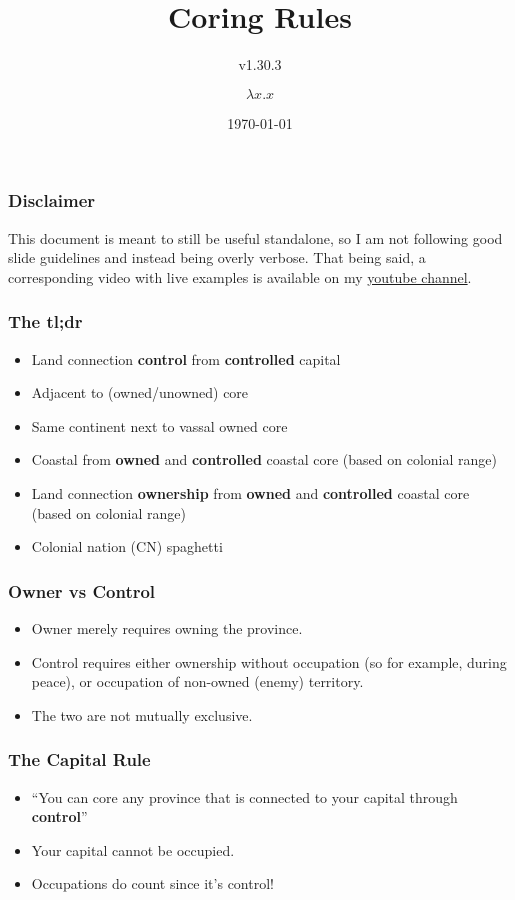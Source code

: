 \documentclass{beamer}
\title{Coring Rules}
\subtitle{v1.30.3}
\author{$\lambda x. x$}
\date{\today}
\begin{document}
\begin{frame}
  \titlepage
\end{frame}

\begin{frame}
  \frametitle{Disclaimer}
  This document is meant to still be useful standalone, so I am not following good slide guidelines and instead being overly verbose. That being said, a corresponding video with live examples is available on my \href{https://www.youtube.com/watch?v=dQw4w9WgXcQ}{youtube channel}.
\end{frame}

\begin{frame}
  \frametitle{The tl;dr}
  \begin{itemize}
    \item Land connection \textbf{control} from \textbf{controlled} capital
    \item Adjacent to (owned/unowned) core
    \item Same continent next to vassal owned core
    \item Coastal from \textbf{owned} and \textbf{controlled} coastal core (based on colonial range)
    \item Land connection \textbf{ownership} from \textbf{owned} and \textbf{controlled} coastal core (based on colonial range)
    \item Colonial nation (CN) spaghetti
  \end{itemize}
\end{frame}

\begin{frame}
  \frametitle{Owner vs Control}
  \begin{itemize}
    \item Owner merely requires owning the province.
    \item Control requires either ownership without occupation (so for example, during peace), or occupation of non-owned (enemy) territory.
    \item The two are not mutually exclusive.
  \end{itemize}
\end{frame}

\begin{frame}
  \frametitle{The Capital Rule}
  \begin{itemize}
    \item ``You can core any province that is connected to your capital through \textbf{control}''
    \item Your capital cannot be occupied.
    \item Occupations do count since it's control!
  \end{itemize}
\end{frame}
\end{document}
